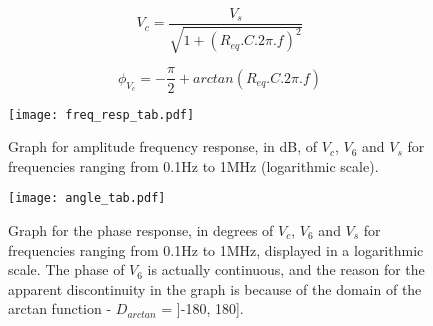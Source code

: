 \begin{equation}
  V_c = \frac{V_s}{\sqrt{1 + (R_{eq}.C.2\pi.f)^2}}
  \label{eq:freqresp1}
\end{equation}

\begin{equation}
  \phi_{V_c} = -\frac{\pi}{2} + arctan(R_{eq}.C.2\pi.f)
  \label{eq:freqresp2}
\end{equation}
 \newpage %
\begin{figure}[H] \centering
\texttt{[image: freq\_resp\_tab.pdf]}
\caption{Graph for amplitude frequency response, in dB, of $V_c$, $V_6$ and $V_s$ for frequencies ranging from 0.1Hz to 1MHz (logarithmic scale).}
\label{fig:freq_resp}
\end{figure}



\begin{figure}[H] \centering
\texttt{[image: angle\_tab.pdf]}
\caption{Graph for the phase response, in degrees of $V_c$, $V_6$ and $V_s$ for frequencies ranging from 0.1Hz to 1MHz, displayed in a logarithmic scale. The phase of $V_6$ is actually continuous, and the reason for the apparent discontinuity in the graph is because of the domain of the arctan function - $D_{arctan}$ = ]-180, 180].}
\label{fig:angle_resp}
\end{figure}


